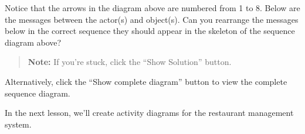Notice that the arrows in the diagram above are numbered from 1 to 8. Below are the messages between the actor(s) and object(s). Can you rearrange the messages below in the correct sequence they should appear in the skeleton of the sequence diagram above?
\begin{quote}
\textbf{Note:} If you're stuck, click the ``Show Solution'' button.
\end{quote}

Alternatively, click the ``Show complete diagram'' button to view the complete sequence diagram.

In the next lesson, we'll create activity diagrams for the restaurant management system.

